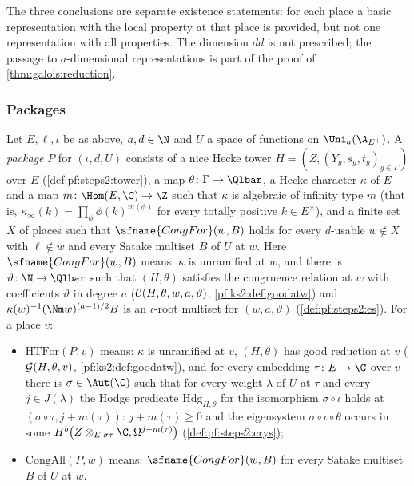 The three conclusions are separate existence statements: for each place a basic representation
with the local property at that place is provided, but not one representation with all properties.
The dimension $dd$ is not prescribed; the passage to $a$-dimensional representations is part of the
proof of \cref{thm:galois:reduction}.

\subsubsection{Packages}

\begin{definition}[Packages]\label{pf:geo:pack}
Let $E,\ell,\iota$ be as above, $a,d\in\N$ and $U$ a space of functions on $\geoUa$. A \emph{package}
$P$ for $(\iota,d,U)$ consists of a nice Hecke tower $H=(Z,(Y_g,s_g,t_g)_{g\in\Gamma})$ over $E$
(\cref{def:pf:steps2:tower}), a map $\theta\colon\Gamma\to\Qlbar$, a Hecke character $\kappa$ of $E$ and
a map $m\colon\Hom(E,\C)\to\Z$ such that $\kappa$ is algebraic of infinity type $m$ (that is,
$\kappa_\infty(k)=\prod_\phi\phi(k)^{m(\phi)}$ for every totally positive $k\in E^\times$), and a finite set
$X$ of places such that $\sfname{CongFor}(w,B)$ holds for every $d$-usable $w\notin X$ with $\ell\notin
w$ and every Satake multiset $B$ of $U$ at $w$. Here $\sfname{CongFor}(w,B)$ means: $\kappa$ is
unramified at $w$, and there is $\vartheta\colon\N\to\Qlbar$ such that $(H,\theta)$ satisfies the
congruence relation at $w$ with coefficients $\vartheta$ in degree $a$
($\mathcal{C}(H,\theta,w,a,\vartheta)$, \cref{pf:ks2:def:goodatw}) and
$\kappa(w)^{-1}(\Nm w)^{(a-1)/2}B$ is an $\iota$-root multiset for $(w,a,\vartheta)$
(\cref{def:pf:steps2:es}). For a place $v$:
\begin{itemize}[nosep]
\item $\mathrm{HTFor}(P,v)$ means: $\kappa$ is unramified at $v$, $(H,\theta)$ has good reduction at
  $v$ ($\mathcal{G}(H,\theta,v)$, \cref{pf:ks2:def:goodatw}), and for every embedding $\tau\colon E\to\C$
  over $v$ there is $\sigma\in\Aut(\C)$ such that for every weight $\lambda$ of $U$ at $\tau$ and every
  $j\in J(\lambda)$ the Hodge predicate $\mathrm{Hdg}_{H,\theta}$ for the isomorphism $\sigma\circ\iota$ holds
  at $(\sigma\circ\tau,j+m(\tau))$: $j+m(\tau)\ge0$ and the eigensystem $\sigma\circ\iota\circ\theta$ occurs in
  some $\geoHdg{Z\otimes_{E,\sigma\tau}\C}{j+m(\tau)}{b}$ (\cref{def:pf:steps2:crys});
\item $\mathrm{CongAll}(P,w)$ means: $\sfname{CongFor}(w,B)$ for every Satake multiset $B$ of $U$ at $w$.

\end{itemize}
\end{definition}

